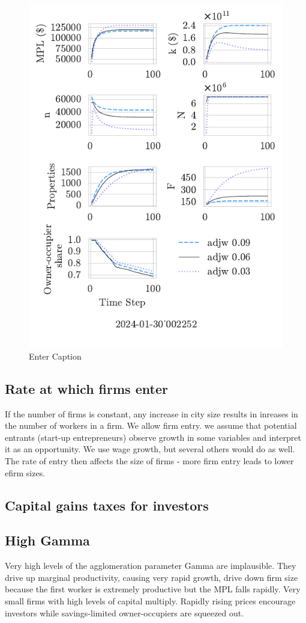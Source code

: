  \begin{figure}
     \centering
     \includegraphics[width=0.5\linewidth]{adjw-2024-01-30_002252.pdf}
     \caption{Enter Caption}
     \label{fig:enter-label}
 \end{figure}


 
\newpage %
\subsection{Rate at which firms enter}
If  the number of firms is constant,  any increase in city size results in inreases in the number of workers in a firm. We allow firm entry. we assume that potential entrants (start-up entrepreneurs) observe growth in some variables and interpret it as an opportunity. We use wage growth, but several others would do as well. The rate of entry then affects the size of firms - more firm entry leads to lower efirm sizes.

 
\newpage %
\subsection{Capital gains taxes for investors}

\newpage %

\subsection{High Gamma}
Very high levels of the agglomeration parameter Gamma are implausible. They drive up marginal productivity, causing very rapid growth, drive down firm size because the first worker is extremely productive but the MPL falls rapidly. Very small firms with high levels of capital multiply. Rapidly rising prices encourage investors while savings-limited owner-occupiers are squeezed out.

